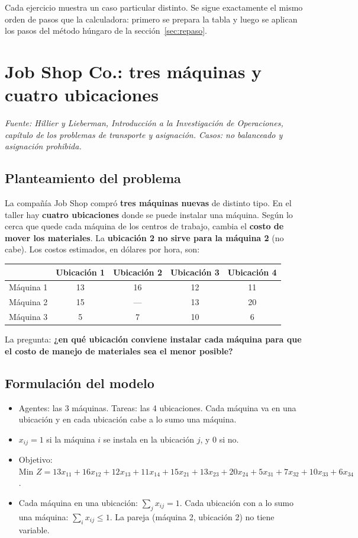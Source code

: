 \documentclass[11pt,a4paper]{article}
\begin{document}
Cada ejercicio muestra un caso particular distinto. Se sigue exactamente el mismo orden de pasos que la
calculadora: primero se prepara la tabla y luego se aplican los pasos del método húngaro de la
sección~\ref{sec:repaso}.

\section{Job Shop Co.: tres máquinas y cuatro ubicaciones}
\textit{Fuente: Hillier y Lieberman, Introducción a la Investigación de Operaciones, capítulo de los problemas
de transporte y asignación. Casos: no balanceado y asignación prohibida.}

\subsection*{Planteamiento del problema}
La compañía Job Shop compró \textbf{tres máquinas nuevas} de distinto tipo. En el taller hay \textbf{cuatro
ubicaciones} donde se puede instalar una máquina. Según lo cerca que quede cada máquina de los centros de trabajo,
cambia el \textbf{costo de mover los materiales}. La \textbf{ubicación 2 no sirve para la máquina 2} (no cabe).
Los costos estimados, en dólares por hora, son:

\begin{center}
\begin{tabular}{lcccc}
\toprule
 & \textbf{Ubicación 1} & \textbf{Ubicación 2} & \textbf{Ubicación 3} & \textbf{Ubicación 4} \\
\midrule
Máquina 1 & 13 & 16 & 12 & 11 \\
Máquina 2 & 15 & --- & 13 & 20 \\
Máquina 3 & 5 & 7 & 10 & 6 \\
\bottomrule
\end{tabular}
\end{center}

La pregunta: \textbf{¿en qué ubicación conviene instalar cada máquina para que el costo de manejo de materiales
sea el menor posible?}

\subsection*{Formulación del modelo}
\begin{itemize}[itemsep=2pt]
  \item Agentes: las 3 máquinas. Tareas: las 4 ubicaciones. Cada máquina va en una ubicación y en cada ubicación
        cabe a lo sumo una máquina.
  \item $x_{ij} = 1$ si la máquina $i$ se instala en la ubicación $j$, y 0 si no.
  \item Objetivo: $\text{Min } Z = 13x_{11} + 16x_{12} + 12x_{13} + 11x_{14} + 15x_{21} + 13x_{23} + 20x_{24} + 5x_{31} + 7x_{32} + 10x_{33} + 6x_{34}$.
  \item Cada máquina en una ubicación: $\sum_j x_{ij} = 1$. Cada ubicación con a lo sumo una máquina:
        $\sum_i x_{ij} \le 1$. La pareja (máquina 2, ubicación 2) no tiene variable.
\end{itemize}
\end{document}

